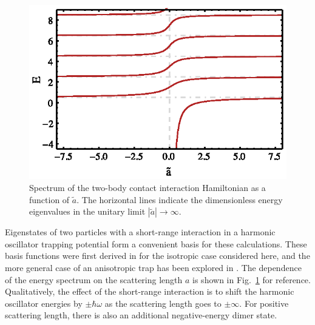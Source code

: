 
\begin{figure}
\centering
\includegraphics[scale=1.2]{SOC/Figures/BuschSpectrum}
\caption[Spectrum of the two-body contact interaction Hamiltonian as a function of $\tilde a$]{\label{fig:BuschSpectrum} Spectrum of the two-body contact interaction Hamiltonian as a function of $\tilde a$. The horizontal lines indicate the dimensionless energy eigenvalues in the unitary limit $|\tilde{a}|\rightarrow\infty$.} 
\end{figure}

Eigenstates of two particles with a short-range interaction in a harmonic oscillator trapping potential form a convenient basis for these calculations. These basis functions were first derived in \cite{Busch} for the isotropic case considered here, and the more general case of an anisotropic trap has been explored in \cite{PhysRevA.74.022712}. The dependence of the energy spectrum on the scattering length $a$ is shown in Fig.~\ref{fig:BuschSpectrum} for reference. Qualitatively, the effect of the short-range interaction is to shift the harmonic oscillator energies by $\pm \hbar\omega$ as the scattering length goes to $\pm \infty$. For positive scattering length, there is also an additional negative-energy dimer state.

